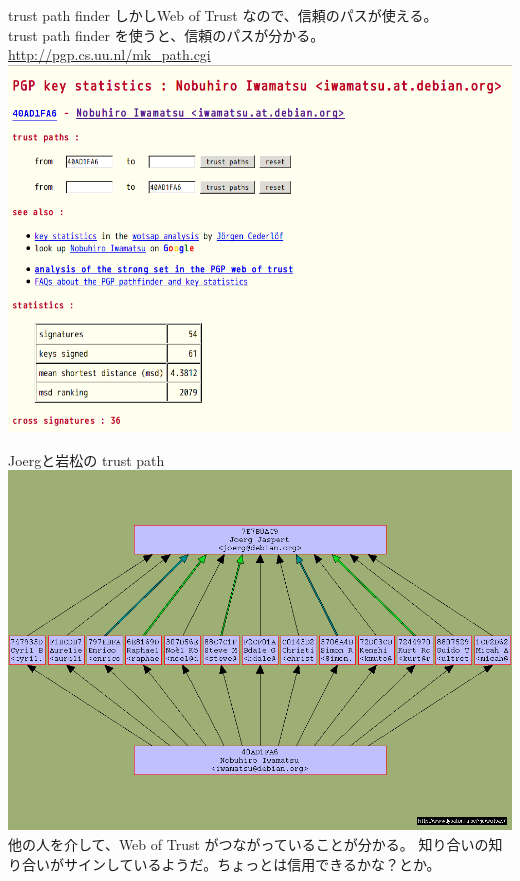 \begin{frame}[containsverbatim]{trust path finder}
しかしWeb of Trust なので、信頼のパスが使える。\\
trust path finder を使うと、信頼のパスが分かる。\\
\url{http://pgp.cs.uu.nl/mk_path.cgi}
\includegraphics[width=1\hsize]{image200909/trust-path.png}
\end{frame}


\begin{frame}[containsverbatim]{Joergと岩松の trust path}
\includegraphics[width=1\hsize]{image200909/0x40AD1FA6-0x7E7B8AC9.png}
他の人を介して、Web of Trust がつながっていることが分かる。
知り合いの知り合いがサインしているようだ。ちょっとは信用できるかな？とか。
\end{frame}

